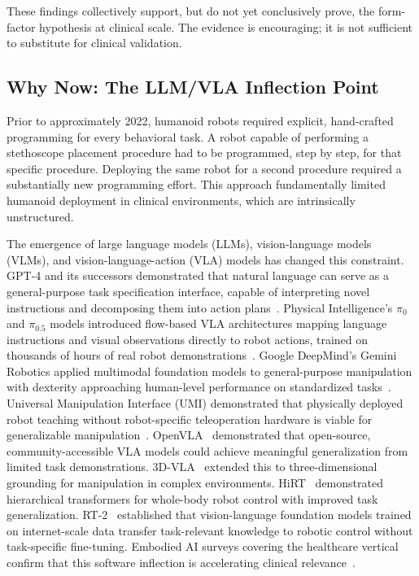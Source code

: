 \documentclass[acmjour]{acmart}
\begin{document}
These findings collectively support, but do not yet conclusively prove, the
form-factor hypothesis at clinical scale. The evidence is encouraging; it is not
sufficient to substitute for clinical validation.

\subsection{Why Now: The LLM/VLA Inflection Point}
\label{sec:llm}

Prior to approximately 2022, humanoid robots required explicit, hand-crafted
programming for every behavioral task. A robot capable of performing a
stethoscope placement procedure had to be programmed, step by step, for that
specific procedure. Deploying the same robot for a second procedure required a
substantially new programming effort. This approach fundamentally limited
humanoid deployment in clinical environments, which are intrinsically
unstructured.

The emergence of large language models (LLMs), vision-language models (VLMs), and
vision-language-action (VLA) models has changed this constraint.
GPT-4 and its successors demonstrated that natural language can serve as a
general-purpose task specification interface, capable of interpreting novel
instructions and decomposing them into action plans~\cite{openai2023gpt4}.
Physical Intelligence's $\pi_0$ and $\pi_{0.5}$ models introduced flow-based
VLA architectures mapping language instructions and visual observations directly
to robot actions, trained on thousands of hours of real robot
demonstrations~\cite{black2024pi0}. Google DeepMind's Gemini Robotics applied
multimodal foundation models to general-purpose manipulation with dexterity
approaching human-level performance on standardized
tasks~\cite{geminiroboticsTeam2025}. Universal Manipulation Interface (UMI)
demonstrated that physically deployed robot teaching without robot-specific
teleoperation hardware is viable for generalizable
manipulation~\cite{chi2024umi}. OpenVLA~\cite{kim2024openvla} demonstrated
that open-source, community-accessible VLA models could achieve meaningful
generalization from limited task demonstrations. 3D-VLA~\cite{zhen20243dvla}
extended this to three-dimensional grounding for manipulation in complex
environments. HiRT~\cite{wen2024hirt} demonstrated hierarchical transformers
for whole-body robot control with improved task generalization. RT-2~\cite{brohan2023rt2}
established that vision-language foundation models trained on internet-scale
data transfer task-relevant knowledge to robotic control without task-specific
fine-tuning. Embodied AI surveys covering the healthcare vertical confirm that
this software inflection is accelerating clinical
relevance~\cite{liu2025screens,mir2026embodied,lisondra2026embodied}.
\end{document}
